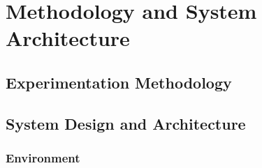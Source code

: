 \part{Methodology and System Architecture}
\chapter{Experimentation Methodology}

\chapter{System Design and Architecture}
\section{Environment}